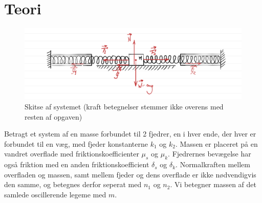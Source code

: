 \chapter{Teori}
%
\begin{figure}[htpb]
    \centering
    \includegraphics[width=0.8\linewidth,origin=c]{figures/systemskitse.png}
    \caption{Skitse af systemet (kraft betegnelser stemmer ikke overens med resten af opgaven)}
    \label{fig:skitse}
\end{figure}
%
Betragt et system af en masse forbundet til 2 fjedrer, en i hver ende, der hver er forbundet til en væg, med fjeder konstanterne $k_1$ og $k_2$. 
Massen er placeret på en vandret overflade med friktionskoefficienter $\mu_s$ og $\mu_k$. 
Fjedrernes bevægelse har også friktion med en anden friktionskoefficient $\delta_s$ og $\delta_k$. 
Normalkraften mellem overfladen og massen, samt mellem fjeder og dens overflade er ikke nødvendigvis den samme, og betegnes derfor seperat med $n_1$ og $n_2$.
Vi betegner massen af det samlede oscillerende legeme med $m$. 

